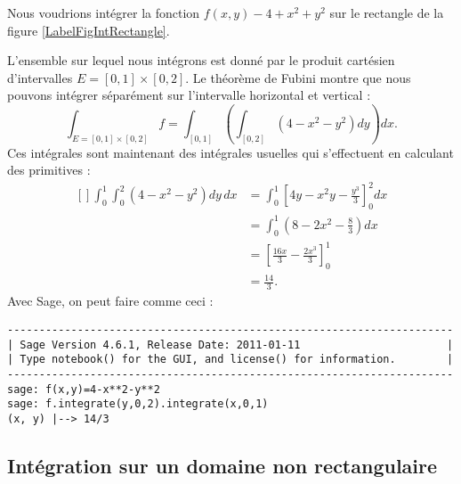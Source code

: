 \begin{example}
    
    Nous voudrions intégrer la fonction $f(x,y)-4+x^2+y^2$ sur le rectangle de la figure \ref{LabelFigIntRectangle}.
    \newcommand{\CaptionFigIntRectangle}{Intégration sur un rectangle.}
    
    L'ensemble sur lequel nous intégrons est donné par le produit cartésien d'intervalles $E=[0,1]\times[0,2]$. Le théorème de Fubini montre que nous pouvons intégrer séparément sur l'intervalle horizontal et vertical :
    \begin{equation}
    	\int_{E=[0,1]\times[0,2]}f=\int_{[0,1]}\left( \int_{[0,2]}(4-x^2-y^2)dy \right)dx.
    \end{equation}
    Ces intégrales sont maintenant des intégrales usuelles qui s'effectuent en calculant des primitives :
    \begin{equation}
        \begin{aligned}[]
            \int_0^1\int_0^2(4-x^2-y^2)dy\,dx&=\int_0^1\left[ 4y-x^2y-\frac{ y^3 }{ 3 } \right]_0^2dx\\
            &=\int_0^1(8-2x^2-\frac{ 8 }{ 3 })dx\\
            &=\left[ \frac{ 16x }{ 3 }-\frac{ 2x^3 }{ 3 } \right]_0^1\\
            &=\frac{ 14 }{ 3 }.
        \end{aligned}
    \end{equation}
    Avec Sage, on peut faire comme ceci :

    \begin{verbatim}
----------------------------------------------------------------------
| Sage Version 4.6.1, Release Date: 2011-01-11                       |
| Type notebook() for the GUI, and license() for information.        |
----------------------------------------------------------------------
sage: f(x,y)=4-x**2-y**2                  
sage: f.integrate(y,0,2).integrate(x,0,1)
(x, y) |--> 14/3

    \end{verbatim}

\end{example}

\subsection{Intégration sur un domaine non rectangulaire}
\label{PgRapIntMultFubiniTri}



